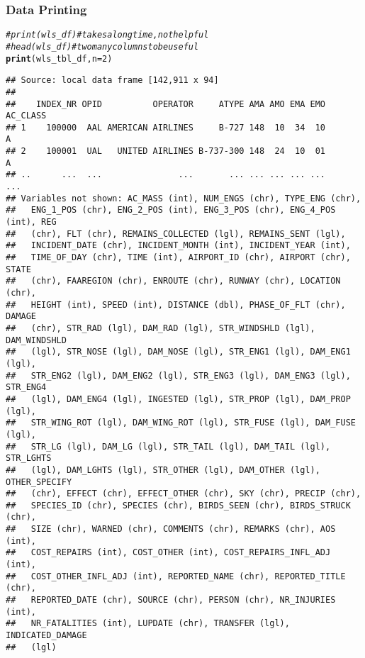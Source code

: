 \documentclass{beamer}\usepackage[]{graphicx}\usepackage[]{color}
\makeatletter
\newcommand{\hlnum}[1]{\textcolor[rgb]{0.686,0.059,0.569}{#1}}%
\newcommand{\hlcom}[1]{\textcolor[rgb]{0.678,0.584,0.686}{\textit{#1}}}%
\newcommand{\hlstd}[1]{\textcolor[rgb]{0.345,0.345,0.345}{#1}}%
\newcommand{\hlkwc}[1]{\textcolor[rgb]{0.333,0.667,0.333}{#1}}%
\newcommand{\hlkwd}[1]{\textcolor[rgb]{0.737,0.353,0.396}{\textbf{#1}}}%
\newenvironment{kframe}{%
 \def\at@end@of@kframe{}%
 \ifinner\ifhmode%
  \def\at@end@of@kframe{\end{minipage}}%
  \begin{minipage}{\columnwidth}%
 \fi\fi%
 \def\FrameCommand##1{\hskip\@totalleftmargin \hskip-\fboxsep
 \colorbox{shadecolor}{##1}\hskip-\fboxsep
     \hskip-\linewidth \hskip-\@totalleftmargin \hskip\columnwidth}%
 \MakeFramed {\advance\hsize-\width
   \@totalleftmargin\z@ \linewidth\hsize
   \@setminipage}}%
 {\par\unskip\endMakeFramed%
 \at@end@of@kframe}
\newenvironment{knitrout}{}{} %
\makeatother
\begin{document}
\begin{frame}[fragile]
  \frametitle{Data Printing}
\begin{knitrout}\footnotesize
{}\color{fgcolor}\begin{kframe}
\begin{alltt}
\hlcom{# print(wls_df)  # takes a long time, not helpful}
\hlcom{# head(wls_df)   # two many columns to be useful}
\hlkwd{print}\hlstd{(wls_tbl_df,} \hlkwc{n} \hlstd{=} \hlnum{2}\hlstd{)}
\end{alltt}
\begin{verbatim}
## Source: local data frame [142,911 x 94]
## 
##    INDEX_NR OPID          OPERATOR     ATYPE AMA AMO EMA EMO AC_CLASS
## 1    100000  AAL AMERICAN AIRLINES     B-727 148  10  34  10        A
## 2    100001  UAL   UNITED AIRLINES B-737-300 148  24  10  01        A
## ..      ...  ...               ...       ... ... ... ... ...      ...
## Variables not shown: AC_MASS (int), NUM_ENGS (chr), TYPE_ENG (chr),
##   ENG_1_POS (chr), ENG_2_POS (int), ENG_3_POS (chr), ENG_4_POS (int), REG
##   (chr), FLT (chr), REMAINS_COLLECTED (lgl), REMAINS_SENT (lgl),
##   INCIDENT_DATE (chr), INCIDENT_MONTH (int), INCIDENT_YEAR (int),
##   TIME_OF_DAY (chr), TIME (int), AIRPORT_ID (chr), AIRPORT (chr), STATE
##   (chr), FAAREGION (chr), ENROUTE (chr), RUNWAY (chr), LOCATION (chr),
##   HEIGHT (int), SPEED (int), DISTANCE (dbl), PHASE_OF_FLT (chr), DAMAGE
##   (chr), STR_RAD (lgl), DAM_RAD (lgl), STR_WINDSHLD (lgl), DAM_WINDSHLD
##   (lgl), STR_NOSE (lgl), DAM_NOSE (lgl), STR_ENG1 (lgl), DAM_ENG1 (lgl),
##   STR_ENG2 (lgl), DAM_ENG2 (lgl), STR_ENG3 (lgl), DAM_ENG3 (lgl), STR_ENG4
##   (lgl), DAM_ENG4 (lgl), INGESTED (lgl), STR_PROP (lgl), DAM_PROP (lgl),
##   STR_WING_ROT (lgl), DAM_WING_ROT (lgl), STR_FUSE (lgl), DAM_FUSE (lgl),
##   STR_LG (lgl), DAM_LG (lgl), STR_TAIL (lgl), DAM_TAIL (lgl), STR_LGHTS
##   (lgl), DAM_LGHTS (lgl), STR_OTHER (lgl), DAM_OTHER (lgl), OTHER_SPECIFY
##   (chr), EFFECT (chr), EFFECT_OTHER (chr), SKY (chr), PRECIP (chr),
##   SPECIES_ID (chr), SPECIES (chr), BIRDS_SEEN (chr), BIRDS_STRUCK (chr),
##   SIZE (chr), WARNED (chr), COMMENTS (chr), REMARKS (chr), AOS (int),
##   COST_REPAIRS (int), COST_OTHER (int), COST_REPAIRS_INFL_ADJ (int),
##   COST_OTHER_INFL_ADJ (int), REPORTED_NAME (chr), REPORTED_TITLE (chr),
##   REPORTED_DATE (chr), SOURCE (chr), PERSON (chr), NR_INJURIES (int),
##   NR_FATALITIES (int), LUPDATE (chr), TRANSFER (lgl), INDICATED_DAMAGE
##   (lgl)
\end{verbatim}
\end{kframe}
\end{knitrout}
\end{frame} 
\end{document}
